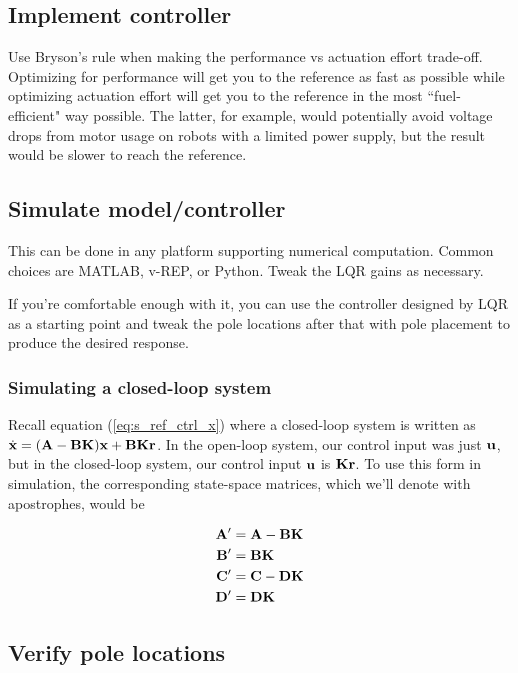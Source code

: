 \subsection{Implement controller}

Use Bryson's rule when making the performance vs actuation effort trade-off.
Optimizing for performance will get you to the reference as fast as possible
while optimizing actuation effort will get you to the reference in the most
``fuel-efficient" way possible. The latter, for example, would potentially avoid
voltage drops from motor usage on robots with a limited power supply, but the
result would be slower to reach the reference.

\subsection{Simulate model/controller}

This can be done in any platform supporting numerical computation. Common
choices are MATLAB, v-REP, or Python. Tweak the LQR gains as necessary.

If you're comfortable enough with it, you can use the controller designed by LQR
as a starting point and tweak the pole locations after that with pole placement
to produce the desired response.

\subsubsection{Simulating a closed-loop system}

Recall equation (\ref{eq:s_ref_ctrl_x}) where a closed-loop system is written as
$\dot{\mathbf{x}} = (\mathbf{A} - \mathbf{B}\mathbf{K})\mathbf{x} + \mathbf{B}\mathbf{K}\mathbf{r}$. In
the open-loop system, our control input was just $\mathbf{u}$, but in the
closed-loop system, our control input $\mathbf{u}$ is $\mathbf{K}\mathbf{r}$. To use this
form in simulation, the corresponding state-space matrices, which we'll denote
with apostrophes, would be

\begin{align*}
  \mathbf{A}' &= \mathbf{A} - \mathbf{B}\mathbf{K} \\
  \mathbf{B}' &= \mathbf{B}\mathbf{K} \\
  \mathbf{C}' &= \mathbf{C} - \mathbf{D}\mathbf{K} \\
  \mathbf{D}' &= \mathbf{D}\mathbf{K}
\end{align*}

\subsection{Verify pole locations}

